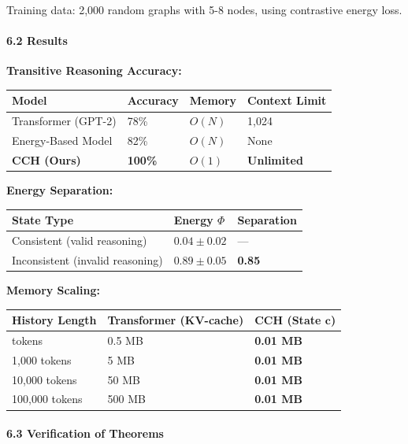 \documentclass[
  11pt,
  a4paper,
]{article}
\begin{document}
Training data: 2,000 random graphs with 5-8 nodes, using contrastive
energy loss.

\paragraph{6.2 Results}\label{results}

\textbf{Transitive Reasoning Accuracy:}

\begin{longtable}[]{@{}llll@{}}
\toprule\noalign{}
Model & Accuracy & Memory & Context Limit \\
\midrule\noalign{}
\endhead
\bottomrule\noalign{}
\endlastfoot
Transformer (GPT-2) & 78\% & \(O(N)\) & 1,024 \\
Energy-Based Model & 82\% & \(O(N)\) & None \\
\textbf{CCH (Ours)} & \textbf{100\%} & \textbf{\(O(1)\)} &
\textbf{Unlimited} \\
\end{longtable}

\textbf{Energy Separation:}

\begin{longtable}[]{@{}lll@{}}
\toprule\noalign{}
State Type & Energy \(\Phi\) & Separation \\
\midrule\noalign{}
\endhead
\bottomrule\noalign{}
\endlastfoot
Consistent (valid reasoning) & \(0.04 \pm 0.02\) & --- \\
Inconsistent (invalid reasoning) & \(0.89 \pm 0.05\) & \textbf{0.85} \\
\end{longtable}

\textbf{Memory Scaling:}

\begin{longtable}[]{@{}lll@{}}
\toprule\noalign{}
History Length & Transformer (KV-cache) & CCH (State \(\mathbf{c}\)) \\
\midrule\noalign{}
\endhead
\bottomrule\noalign{}
\endlastfoot
100 tokens & 0.5 MB & \textbf{0.01 MB} \\
1,000 tokens & 5 MB & \textbf{0.01 MB} \\
10,000 tokens & 50 MB & \textbf{0.01 MB} \\
100,000 tokens & 500 MB & \textbf{0.01 MB} \\
\end{longtable}

\paragraph{6.3 Verification of Theorems}\label{verification-of-theorems}
\end{document}
